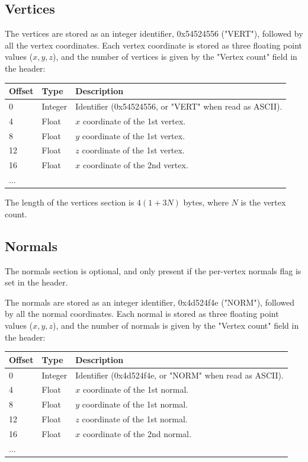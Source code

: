 \subsection{Vertices}
The vertices are stored as an integer identifier, 0x54524556 ("VERT"), followed
by all the vertex coordinates. Each vertex coordinate is stored as three
floating point values ($x,y,z$), and the number of vertices is given by the
"Vertex count" field in the header:

\begin{tabular}{|l|l|l|}\hline
\textbf{Offset} &  \textbf{Type} & \textbf{Description}\\ \hline
0 & Integer & Identifier (0x54524556, or "VERT" when read as ASCII).\\ \hline
4 & Float & $x$ coordinate of the 1st vertex.\\ \hline
8 & Float & $y$ coordinate of the 1st vertex.\\ \hline
12 & Float & $z$ coordinate of the 1st vertex.\\ \hline
16 & Float & $x$ coordinate of the 2nd vertex.\\ \hline
... & & \\ \hline
\end{tabular}

The length of the vertices section is $4(1+3N)$ bytes, where $N$ is the vertex
count.

\subsection{Normals}
The normals section is optional, and only present if the per-vertex normals
flag is set in the header.

The normals are stored as an integer identifier, 0x4d524f4e ("NORM"), followed
by all the normal coordinates. Each normal is stored as three floating point
values ($x,y,z$), and the number of normals is given by the "Vertex count" field
in the header:

\begin{tabular}{|l|l|l|}\hline
\textbf{Offset} &  \textbf{Type} & \textbf{Description}\\ \hline
0 & Integer & Identifier (0x4d524f4e, or "NORM" when read as ASCII).\\ \hline
4 & Float & $x$ coordinate of the 1st normal.\\ \hline
8 & Float & $y$ coordinate of the 1st normal.\\ \hline
12 & Float & $z$ coordinate of the 1st normal.\\ \hline
16 & Float & $x$ coordinate of the 2nd normal.\\ \hline
... & & \\ \hline
\end{tabular}

